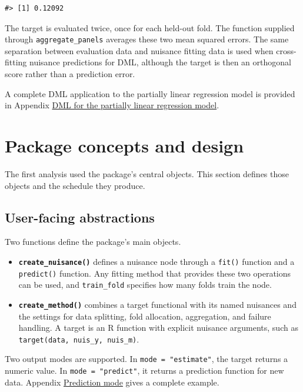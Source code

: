 \begin{verbatim}
#> [1] 0.12092
\end{verbatim}

The target is evaluated twice, once for each held-out fold. The function supplied through \texttt{aggregate\_panels} averages these two mean squared errors. The same separation between evaluation data and nuisance fitting data is used when cross-fitting nuisance predictions for DML, although the target is then an orthogonal score rather than a prediction error.

A complete DML application to the partially linear regression model is provided in Appendix \hyperref[app:plr-pension]{DML for the partially linear regression model}.

\section{Package concepts and design}\label{sec:design}

The first analysis used the package's central objects. This section defines those objects and the schedule they produce.

\subsection{User-facing abstractions}\label{subsec:user-facing}

Two functions define the package's main objects.

\begin{itemize}
\tightlist
\item
  \textbf{\texttt{create\_nuisance()}} defines a nuisance node through a \texttt{fit()} function and a \texttt{predict()} function. Any fitting method that provides these two operations can be used, and \texttt{train\_fold} specifies how many folds train the node.
\item
  \textbf{\texttt{create\_method()}} combines a target functional with its named nuisances and the settings for data splitting, fold allocation, aggregation, and failure handling. A target is an R function with explicit nuisance arguments, such as \texttt{target(data,\ nuis\_y,\ nuis\_m)}.
\end{itemize}

Two output modes are supported. In \texttt{mode\ =\ "estimate"}, the target returns a numeric value. In \texttt{mode\ =\ "predict"}, it returns a prediction function for new data. Appendix \hyperref[app:predict]{Prediction mode} gives a complete example.

